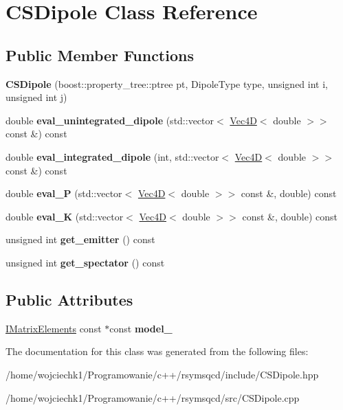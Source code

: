 \hypertarget{classCSDipole}{}\section{C\+S\+Dipole Class Reference}
\label{classCSDipole}
\subsection*{Public Member Functions}
\begin{DoxyCompactItemize}
\item 
\mbox{\label{classCSDipole_ae83f860e66196eead00bf2f8e82a0c49}} 
{\bfseries C\+S\+Dipole} (boost\+::property\+\_\+tree\+::ptree pt, Dipole\+Type type, unsigned int i, unsigned int j)
\item 
\mbox{\label{classCSDipole_adfd7fba72b9914ce8af7f9b7fd2adc28}} 
double {\bfseries eval\+\_\+unintegrated\+\_\+dipole} (std\+::vector$<$ \hyperlink{classVec4D}{Vec4D}$<$ double $>$$>$ const \&) const
\item 
\mbox{\label{classCSDipole_a1505e9e1e6340264127bf773b911a0c9}} 
double {\bfseries eval\+\_\+integrated\+\_\+dipole} (int, std\+::vector$<$ \hyperlink{classVec4D}{Vec4D}$<$ double $>$$>$ const \&) const
\item 
\mbox{\label{classCSDipole_ac24dc706498541f9c824b90c96780252}} 
double {\bfseries eval\+\_\+P} (std\+::vector$<$ \hyperlink{classVec4D}{Vec4D}$<$ double $>$$>$ const \&, double) const
\item 
\mbox{\label{classCSDipole_a4d81b94ed59dd5716e7966daf5b2516c}} 
double {\bfseries eval\+\_\+K} (std\+::vector$<$ \hyperlink{classVec4D}{Vec4D}$<$ double $>$$>$ const \&, double) const
\item 
\mbox{\label{classCSDipole_a1eaaba4413e967b6e93a4b6bf24d3051}} 
unsigned int {\bfseries get\+\_\+emitter} () const
\item 
\mbox{\label{classCSDipole_a9dc70c81039b4b9b45c32462ec7dff7e}} 
unsigned int {\bfseries get\+\_\+spectator} () const
\end{DoxyCompactItemize}
\subsection*{Public Attributes}
\begin{DoxyCompactItemize}
\item 
\mbox{\label{classCSDipole_a0f5d6f5387740845f43b50d0faa9c61d}} 
\hyperlink{classIMatrixElements}{I\+Matrix\+Elements} const  $\ast$const {\bfseries model\+\_\+}
\end{DoxyCompactItemize}


The documentation for this class was generated from the following files\+:\begin{DoxyCompactItemize}
\item 
/home/wojciechk1/\+Programowanie/c++/rsymsqcd/include/C\+S\+Dipole.\+hpp\item 
/home/wojciechk1/\+Programowanie/c++/rsymsqcd/src/C\+S\+Dipole.\+cpp\end{DoxyCompactItemize}
